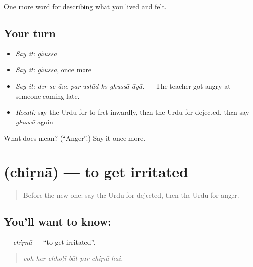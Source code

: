 \begin{grammarlens}[title={What you've built}]
One more word for describing what you lived and felt.
\end{grammarlens}

\subsection*{Your turn}
\begin{itemize}
\raggedright
  \item \emph{Say it:} \emph{ghussā}
  \item \emph{Say it:} \emph{ghussā}, once more
  \item \emph{Say it:} \emph{der se āne par ustād ko ghussā āyā.} — The teacher got angry at someone coming late.
  \item \emph{Recall:} say the Urdu for to fret inwardly, then the Urdu for dejected, then say \emph{ghussā} again
\end{itemize}

\begin{tcolorbox}[breakable,colback=teal!4,colframe=teal!35!black,title={Before you move on}]
What does  mean? (\textquotedblleft{}Anger\textquotedblright{}.) Say it once more.
\end{tcolorbox}
\section[\texorpdfstring{\ur{چڑنا} (chiṛnā)}{چڑنا (chiṛnā)}]{ (chiṛnā) — to get irritated}

\label{lesson:UR-C444-chirna}



\begin{quote}
Before the new one: say the Urdu for dejected, then the Urdu for anger.
\end{quote}

\subsection*{You'll want to know: }
\textbf{} — \emph{chiṛnā} — \textquotedblleft{}to get irritated\textquotedblright{}.

\begin{quote}
      
\end{quote}

\begin{quote}
\emph{voh har chhoṭī bāt par chiṛtā hai.}
\end{quote}

